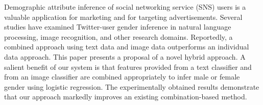Demographic attribute inference of social networking service (SNS) users is a valuable application for marketing and for targeting advertisements. Several studies have examined Twitter-user gender inference in natural language processing, image recognition, and other research domains. Reportedly, a combined approach using text data and image data outperforms an individual data approach. This paper presents a proposal of a novel hybrid approach. A salient benefit of our system is that features provided from a text classifier and from an image classifier are combined appropriately to infer male or female gender using logistic regression. The experimentally obtained results demonstrate that our approach markedly improves an existing combination-based method.

